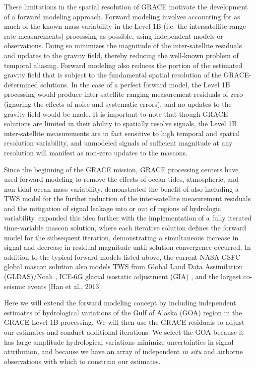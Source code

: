 \documentclass[review,oneside]{igs}
\begin{document}
These limitations in the spatial resolution of GRACE motivate the development of a forward modeling approach. Forward modeling involves accounting for as much of the known mass variability in the Level 1B (i.e. the intersatellite range rate measurements) processing as possible, using independent models or observations. Doing so minimizes the magnitude of the inter-satellite residuals and updates to the gravity field, thereby reducing the well-known problem of temporal aliasing. Forward modeling also reduces the portion of the estimated gravity field that is subject to the fundamental spatial resolution of the GRACE-determined solutions. In the case of a perfect forward model, the Level 1B processing would produce inter-satellite ranging measurement residuals of zero (ignoring the effects of noise and systematic errors), and no updates to the gravity field would be made. It is important to note that though GRACE solutions are limited in their ability to spatially resolve signals, the Level 1B inter-satellite measurements are in fact sensitive to high temporal and spatial resolution variability, and unmodeled signals of sufficient magnitude at any resolution will manifest as non-zero updates to the mascons.

Since the beginning of the GRACE mission, GRACE processing centers have used forward modeling to remove the effects of ocean tides, atmospheric, and non-tidal ocean mass variability. \cite{sabaka_improving_2010} demonstrated the benefit of also including a TWS model for the further reduction of the inter-satellite measurement residuals and the mitigation of signal leakage into or out of regions of hydrologic variability. \cite{luthcke_antarctica_2013} expanded this idea further with the implementation of a fully iterated time-variable mascon solution, where each iterative solution defines the forward model for the subsequent iteration, demonstrating a simultaneous increase in signal and decrease in residual magnitude until solution convergence occurred. In addition to the typical forward models listed above, the current NASA GSFC global mascon solution also models TWS from Global Land Data Assimilation (GLDAS)/Noah \citep{rodell_global_2004}, ICE-6G glacial isostatic adjustment (GIA) \citep{peltier_space_2015}, and the largest co-seismic events [Han et al., 2013]. 

Here we will extend the forward modeling concept by including independent estimates of hydrological variations of the Gulf of Alaska (GOA) region in the GRACE Level 1B processing. We will then use the GRACE residuals to adjust our estimates and conduct additional iterations. We select the GOA because it has large amplitude hydrological variations minimize uncertainties in signal attribution, and because we have an array of independent \textit{in situ} and airborne observations with which to constrain our estimates.
\end{document}
